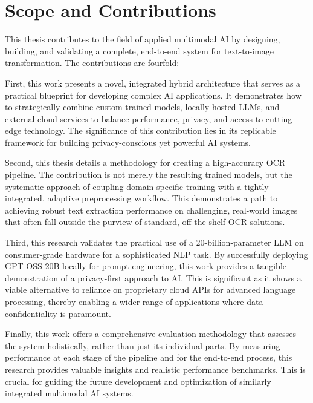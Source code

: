 \section{Scope and Contributions}
This thesis contributes to the field of applied multimodal AI by designing, building, and validating a complete, end-to-end system for text-to-image transformation. The contributions are fourfold:

First, this work presents a novel, integrated hybrid architecture that serves as a practical blueprint for developing complex AI applications. It demonstrates how to strategically combine custom-trained models, locally-hosted LLMs, and external cloud services to balance performance, privacy, and access to cutting-edge technology. The significance of this contribution lies in its replicable framework for building privacy-conscious yet powerful AI systems.

Second, this thesis details a methodology for creating a high-accuracy OCR pipeline. The contribution is not merely the resulting trained models, but the systematic approach of coupling domain-specific training with a tightly integrated, adaptive preprocessing workflow. This demonstrates a path to achieving robust text extraction performance on challenging, real-world images that often fall outside the purview of standard, off-the-shelf OCR solutions.

Third, this research validates the practical use of a 20-billion-parameter LLM on consumer-grade hardware for a sophisticated NLP task. By successfully deploying GPT-OSS-20B locally for prompt engineering, this work provides a tangible demonstration of a privacy-first approach to AI. This is significant as it shows a viable alternative to reliance on proprietary cloud APIs for advanced language processing, thereby enabling a wider range of applications where data confidentiality is paramount.

Finally, this work offers a comprehensive evaluation methodology that assesses the system holistically, rather than just its individual parts. By measuring performance at each stage of the pipeline and for the end-to-end process, this research provides valuable insights and realistic performance benchmarks. This is crucial for guiding the future development and optimization of similarly integrated multimodal AI systems.

